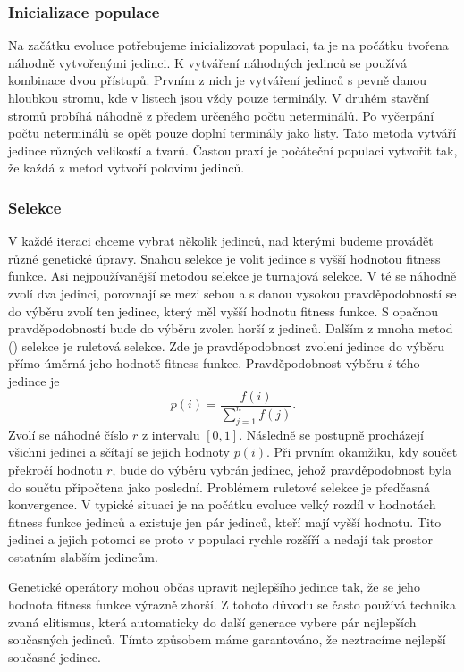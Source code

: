 \subsubsection{Inicializace populace}
Na začátku evoluce potřebujeme inicializovat populaci, ta je na počátku tvořena náhodně vytvořenými jedinci. K vytváření náhodných jedinců se používá kombinace dvou přístupů.
Prvním z nich je vytváření jedinců s pevně danou hloubkou stromu, kde v listech jsou vždy pouze terminály. V druhém stavění stromů probíhá náhodně z předem určeného počtu neterminálů.
Po vyčerpání počtu neterminálů se opět pouze doplní terminály jako listy. Tato metoda vytváří jedince různých velikostí a tvarů.
Častou praxí je počáteční populaci vytvořit tak, že každá z metod vytvoří polovinu jedinců. 


\subsubsection{Selekce}
V každé iteraci chceme vybrat několik jedinců, nad kterými budeme provádět různé genetické úpravy. Snahou selekce je volit jedince s vyšší hodnotou fitness funkce.
Asi nejpoužívanější metodou selekce je turnajová selekce. 
V té se náhodně zvolí dva jedinci, porovnají se mezi sebou a s danou vysokou pravděpodobností se do výběru zvolí ten jedinec, který měl vyšší hodnotu fitness funkce. S opačnou pravděpodobností bude do výběru zvolen horší z jedinců.
Dalším z mnoha metod (\cite{selekcniMetody}) selekce je ruletová selekce. Zde je pravděpodobnost zvolení jedince do výběru přímo úměrná jeho hodnotě fitness funkce.
Pravděpodobnost výběru $i$-tého jedince je 
\[p(i) = \frac{f(i)}{\sum_{j=1}^{n} f(j)}. \]
Zvolí se náhodné číslo $r$ z intervalu $[0,1]$. Následně se postupně procházejí všichni jedinci a sčítají se jejich hodnoty $p(i)$. Při prvním okamžiku, kdy součet překročí hodnotu $r$, bude do výběru vybrán jedinec, jehož pravděpodobnost byla do součtu připočtena jako poslední.
Problémem ruletové selekce je předčasná konvergence. V typické situaci je na počátku evoluce velký rozdíl v hodnotách fitness funkce jedinců a existuje jen pár jedinců, kteří mají vyšší hodnotu.
Tito jedinci a jejich potomci se proto v populaci rychle rozšíří a nedají tak prostor ostatním slabším jedincům.


\par
Genetické operátory mohou občas upravit nejlepšího jedince tak, že se jeho hodnota fitness funkce výrazně zhorší.
Z tohoto důvodu se často používá technika zvaná elitismus, která automaticky do další generace vybere pár nejlepších současných jedinců. 
Tímto způsobem máme garantováno, že neztracíme nejlepší současné jedince.




